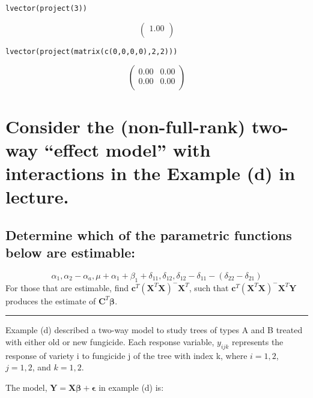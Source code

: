 \documentclass[11pt]{article}
\begin{document}
\begin{verbatim}
lvector(project(3))
\end{verbatim}

\[ \begin{pmatrix}{} 1.00
\\ \end{pmatrix} \]



\begin{verbatim}
lvector(project(matrix(c(0,0,0,0),2,2)))
\end{verbatim}

\[ \begin{pmatrix}{} 0.00 & 0.00 \\ 0.00 & 0.00 \\ 
\end{pmatrix} \]
\section{Consider the (non-full-rank) two-way ``effect model'' with interactions in the Example (d) in lecture.}
\label{sec-5}
\subsection{Determine which of the parametric functions below are estimable:}
\label{sec-5-1}

\[
\alpha_1,\alpha_2 - \alpha_a, \mu + \alpha_1+ \beta_1+\delta_{11},
\delta_{12}, \delta_{12} - \delta_{11} - (\delta_{22} - \delta_{21})
\]
For those that are estimable, find $\mathbf{c}^T
(\mathbf{X}^{T}\mathbf{X})^{-}\mathbf{X}^{T}$, such that  $\mathbf{c}^T
(\mathbf{X}^{T}\mathbf{X})^{-}\mathbf{X}^{T}\mathbf{Y}$ produces the
estimate of $\mathbf{C}^{T}\mathbf{\beta}$.

\rule{0.8\textwidth}{.4pt}

Example (d) described a two-way model to study trees of types A and B
treated with either old or new fungicide. Each response variable,
$y_{ijk}$ represents the response of variety i to fungicide j of
the tree with index k, where $i=1,2$, $j=1,2$, and $k=1,2$. 

The model, $\mathbf{Y}=\mathbf{X\beta}+ \mathbf{\epsilon}$ in example (d) is:
\end{document}

